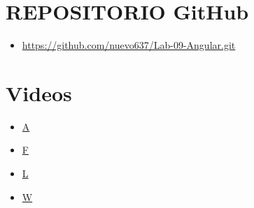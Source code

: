 \documentclass{article}
\begin{document}
	\clearpage




	\section{REPOSITORIO GitHub}

	\begin{itemize}
		\item \url{https://github.com/nuevo637/Lab-09-Angular.git}
	\end{itemize}
	
	\section{Videos}
	\begin{itemize}
		\item \url{A}
		\item \url{F}
		\item \url{L}
		\item \url{W}
	\end{itemize}
\end{document}
